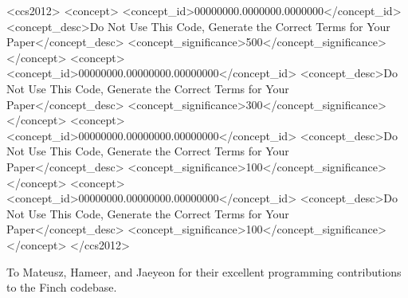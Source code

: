 \documentclass[acmsmall,screen,review,anonymous]{acmart}
\begin{document}
\begin{CCSXML}
<ccs2012>
 <concept>
  <concept_id>00000000.0000000.0000000</concept_id>
  <concept_desc>Do Not Use This Code, Generate the Correct Terms for Your Paper</concept_desc>
  <concept_significance>500</concept_significance>
 </concept>
 <concept>
  <concept_id>00000000.00000000.00000000</concept_id>
  <concept_desc>Do Not Use This Code, Generate the Correct Terms for Your Paper</concept_desc>
  <concept_significance>300</concept_significance>
 </concept>
 <concept>
  <concept_id>00000000.00000000.00000000</concept_id>
  <concept_desc>Do Not Use This Code, Generate the Correct Terms for Your Paper</concept_desc>
  <concept_significance>100</concept_significance>
 </concept>
 <concept>
  <concept_id>00000000.00000000.00000000</concept_id>
  <concept_desc>Do Not Use This Code, Generate the Correct Terms for Your Paper</concept_desc>
  <concept_significance>100</concept_significance>
 </concept>
</ccs2012>
\end{CCSXML}




\maketitle






\begin{acks}
    To Mateusz, Hameer, and Jaeyeon for their excellent programming contributions to the Finch codebase.
\end{acks}
\end{document}
